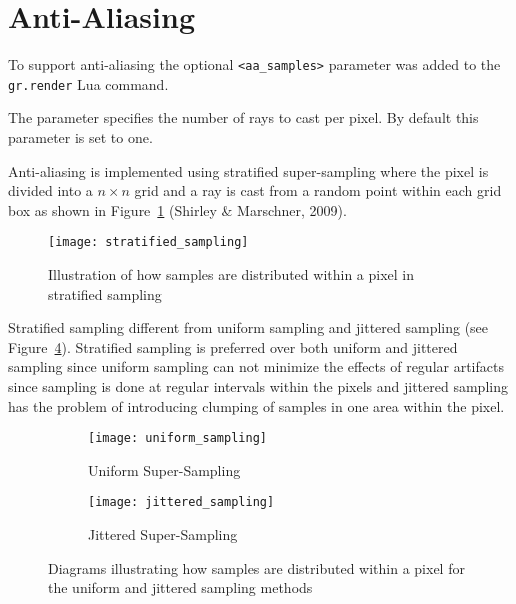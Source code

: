\section{Anti-Aliasing}

To support anti-aliasing the optional \verb|<aa_samples>| parameter was added to
the \verb|gr.render| Lua command.

The parameter specifies the number of rays to cast per pixel. By default this
parameter is set to one.

Anti-aliasing is implemented using stratified super-sampling where the pixel is
divided into a $n\times n$ grid and a ray is cast from a random point within 
each grid box as shown in Figure~\ref{fig:image1} (Shirley \& Marschner, 2009).

\begin{figure}[ht]
  \texttt{[image: stratified\_sampling]}
  \caption{Illustration of how samples are distributed within a pixel in 
  stratified sampling}
  \label{fig:image1}
\end{figure}

Stratified sampling different from uniform sampling and jittered 
sampling (see Figure~\ref{fig:image2}). Stratified sampling is preferred over 
both uniform and jittered sampling since uniform sampling can not minimize the 
effects of regular artifacts since sampling is done at regular intervals within 
the pixels and jittered sampling has the problem of introducing clumping of 
samples in one area within the pixel.

\begin{figure}[ht]
\begin{subfigure}{0.5\textwidth}
  \texttt{[image: uniform\_sampling]}
  \caption{Uniform Super-Sampling}
  \label{fig:subim1}
\end{subfigure}
\begin{subfigure}{0.5\textwidth}
  \texttt{[image: jittered\_sampling]}
  \caption{Jittered Super-Sampling}
  \label{fig:subim2}
\end{subfigure}
\caption{Diagrams illustrating how samples are distributed within a pixel for
the uniform and jittered sampling methods}
\label{fig:image2}
\end{figure}

